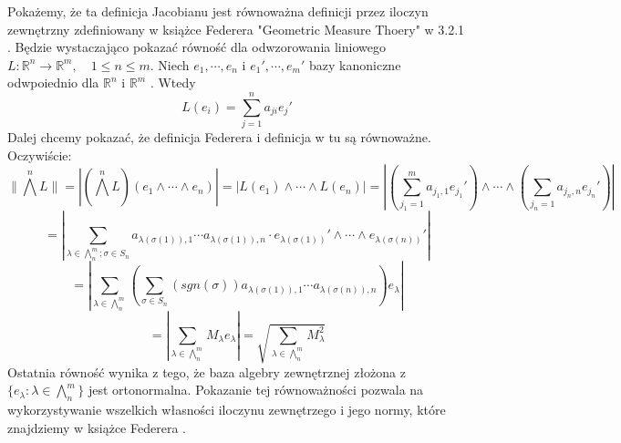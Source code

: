 \begin{lem}
	Pokażemy, że ta definicja Jacobianu jest równoważna definicji przez iloczyn zewnętrzny zdefiniowany w książce Federera "Geometric Measure Thoery" w 3.2.1 \citep{Federer}. Będzie wystaczająco pokazać równość dla odwzorowania liniowego $L: \mathbb{R}^n \rightarrow \mathbb{R}^m, \quad 1 \leq n \leq m$. Niech $e_1, \cdots, e_n$ i $e_1', \cdots, e_m'$ bazy kanoniczne odwpoiednio dla $\mathbb{R}^n$ i $\mathbb{R}^m$ . Wtedy $$
		L(e_i) = \sum_{j=1}^n a_{ji} e_j'
	$$
	Dalej chcemy pokazać, że definicja Federera i definicja w tu są równoważne. Oczywiście:
	$$
		\| \bigwedge^n L \| = |(\bigwedge^n L) (e_1 \wedge \cdots \wedge e_n)| 
		= |L(e_1) \wedge \cdots \wedge L(e_n)| 
		= \left| (\sum^m_{j_1=1}a_{j_1, 1} e_{j_1}') \wedge \cdots \wedge (\sum_{j_n=1} a_{j_n, n} e_{j_n}') \right| 
	$$
	$$
		= \left| \sum_{\lambda \in \bigwedge^m_n; \sigma \in S_n} a_{\lambda(\sigma(1)), 1} \cdots a_{\lambda(\sigma(1)), n} 
			\cdot e_{\lambda(\sigma(1))}' \wedge \cdots \wedge e_{\lambda(\sigma(n))}'\right|
	$$
	$$
		= \left| \sum_{\lambda \in \bigwedge^m_n} \left( \sum_{\sigma \in S_n} (sgn(\sigma))a_{\lambda(\sigma(1)), 1} \cdots a_{\lambda(\sigma(n)), n} \right) e_{\lambda} \right|
	$$
	$$
		= \left| \sum_{\lambda \in \bigwedge_n^m} M_{\lambda} e_{\lambda} \right| = \sqrt{\sum_{\lambda \in \bigwedge_n^m} M_{\lambda}^2}
	$$
	Ostatnia równość wynika z tego, że baza algebry zewnętrznej złożona z $\{ e_{\lambda}: \lambda \in \bigwedge_n^m\}$ jest ortonormalna.\newline
	Pokazanie tej równoważności pozwala na wykorzystywanie wszelkich własności iloczynu zewnętrzego i jego normy, które znajdziemy w książce Federera \citep{Federer}.
\end{lem}